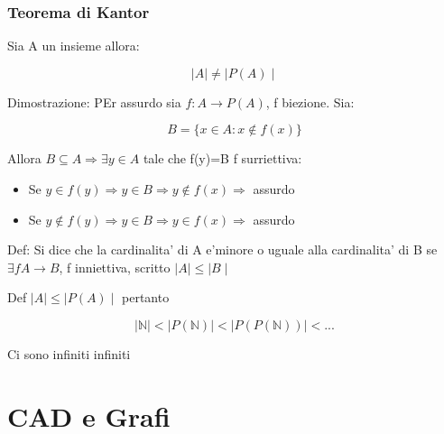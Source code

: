 \documentclass{article}
\begin{document}
        \subsubsection{Teorema di Kantor}
        \begin{flushleft}
          Sia A un insieme allora:
        \end{flushleft}
        \begin{equation*}
          \mid A \mid \neq \mid P(A) \mid
        \end{equation*}
        \begin{flushleft}
          Dimostrazione: PEr assurdo sia $f: A \to P(A)$, f biezione. Sia:
        \end{flushleft}
        \begin{equation*}
          B=\{ x\in A: x \notin f(x)\}
        \end{equation*}
        \begin{flushleft}
          Allora $B \subseteq A \Rightarrow \exists y \in A$ tale che f(y)=B f surriettiva:
        \end{flushleft}
        \begin{itemize}
          \item Se $y\in f(y) \Rightarrow y\in B \Rightarrow y \notin f(x) \Rightarrow$ assurdo
          \item Se $y\notin f(y) \Rightarrow y\in B \Rightarrow y \in f(x) \Rightarrow$ assurdo
        \end{itemize}
        \begin{flushleft}
          Def: Si dice che la cardinalita' di A e'minore o uguale alla cardinalita' di B se $\exists f A \to B$, f inniettiva, scritto $\mid A \mid \leq \mid B \mid$
        \end{flushleft}
        \begin{flushleft}
          Def $\mid A \mid \leq \mid P(A) \mid$ pertanto
        \end{flushleft}
        \begin{equation*}
          \mid \mathbb{N} \mid < \mid P(\mathbb{N}) \mid <\mid P(P(\mathbb{N}))\mid < ...
        \end{equation*}
        \begin{flushleft}
          Ci sono infiniti infiniti
        \end{flushleft} 
        \section{CAD e Grafi}
\end{document}
